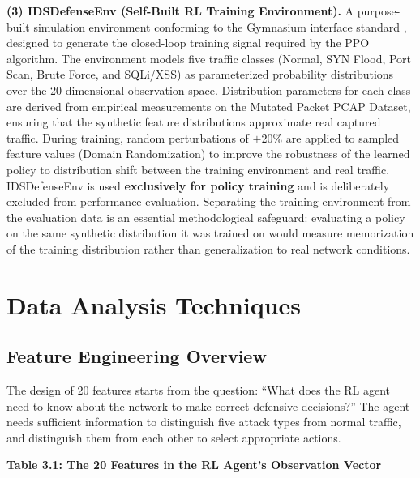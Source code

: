 \documentclass[12pt,a4paper]{report}
\begin{document}
\textbf{(3) IDSDefenseEnv (Self-Built RL Training Environment).} A purpose-built simulation environment conforming to the Gymnasium interface standard \cite{gymnasium2023}, designed to generate the closed-loop training signal required by the PPO algorithm. The environment models five traffic classes (Normal, SYN Flood, Port Scan, Brute Force, and SQLi/XSS) as parameterized probability distributions over the 20-dimensional observation space. Distribution parameters for each class are derived from empirical measurements on the Mutated Packet PCAP Dataset, ensuring that the synthetic feature distributions approximate real captured traffic. During training, random perturbations of $\pm$20\% are applied to sampled feature values (Domain Randomization) to improve the robustness of the learned policy to distribution shift between the training environment and real traffic. IDSDefenseEnv is used \textbf{exclusively for policy training} and is deliberately excluded from performance evaluation. Separating the training environment from the evaluation data is an essential methodological safeguard: evaluating a policy on the same synthetic distribution it was trained on would measure memorization of the training distribution rather than generalization to real network conditions.

\section{Data Analysis Techniques}

\subsection{Feature Engineering Overview}

The design of 20 features starts from the question: ``What does the RL agent need to know about the network to make correct defensive decisions?'' The agent needs sufficient information to distinguish five attack types from normal traffic, and distinguish them from each other to select appropriate actions.

\textbf{Table 3.1: The 20 Features in the RL Agent's Observation Vector}
\end{document}
